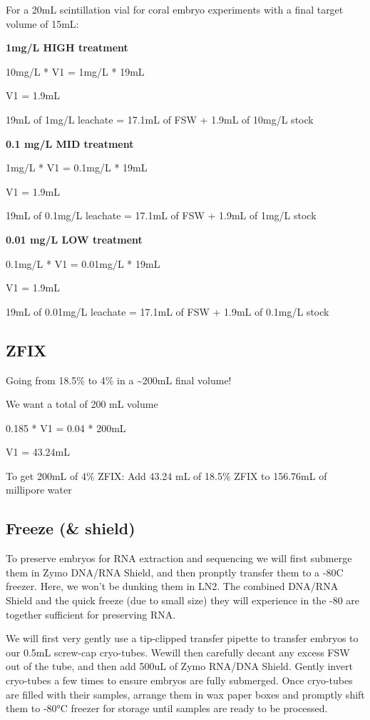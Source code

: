 \documentclass[
  letterpaper,
  DIV=11,
  numbers=noendperiod]{scrartcl}
\begin{document}
For a 20mL scintillation vial for coral embryo experiments with a final
target volume of 15mL:

\textbf{1mg/L HIGH treatment}

10mg/L * V1 = 1mg/L * 19mL

V1 = 1.9mL

19mL of 1mg/L leachate = 17.1mL of FSW + 1.9mL of 10mg/L stock

\textbf{0.1 mg/L MID treatment}

1mg/L * V1 = 0.1mg/L * 19mL

V1 = 1.9mL

19mL of 0.1mg/L leachate = 17.1mL of FSW + 1.9mL of 1mg/L stock

\textbf{0.01 mg/L LOW treatment}

0.1mg/L * V1 = 0.01mg/L * 19mL

V1 = 1.9mL

19mL of 0.01mg/L leachate = 17.1mL of FSW + 1.9mL of 0.1mg/L stock

\hypertarget{zfix}{%
\subsection{ZFIX}\label{zfix}}

Going from 18.5\% to 4\% in a \textasciitilde200mL final volume!

We want a total of 200 mL volume

0.185 * V1 = 0.04 * 200mL

V1 = 43.24mL

To get 200mL of 4\% ZFIX: Add 43.24 mL of 18.5\% ZFIX to 156.76mL of
millipore water

\hypertarget{freeze-shield}{%
\subsection{Freeze (\& shield)}\label{freeze-shield}}

To preserve embryos for RNA extraction and sequencing we will first
submerge them in Zymo DNA/RNA Shield, and then pronptly transfer them to
a -80C freezer. Here, we won't be dunking them in LN2. The combined
DNA/RNA Shield and the quick freeze (due to small size) they will
experience in the -80 are together sufficient for preserving RNA.

We will first very gently use a tip-clipped transfer pipette to transfer
embryos to our 0.5mL screw-cap cryo-tubes. Wewill then carefully decant
any excess FSW out of the tube, and then add 500uL of Zymo RNA/DNA
Shield. Gently invert cryo-tubes a few times to ensure embryos are fully
submerged. Once cryo-tubes are filled with their samples, arrange them
in wax paper boxes and promptly shift them to -80°C freezer for storage
until samples are ready to be processed.
\end{document}
